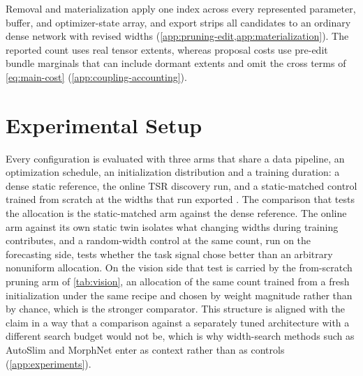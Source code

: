 \documentclass[10pt]{article}
\theoremstyle{paper}
\begin{document}
Removal and materialization apply one index across every represented parameter, buffer, and optimizer-state array, and export strips all candidates to an ordinary dense network with revised widths (\cref{app:pruning-edit,app:materialization}). The reported count uses real tensor extents, whereas proposal costs use pre-edit bundle marginals that can include dormant extents and omit the cross terms of \cref{eq:main-cost} (\cref{app:coupling-accounting}).

\section{Experimental Setup}
\label{sec:experiments}
Every configuration is evaluated with three arms that share a data pipeline, an optimization schedule, an initialization distribution and a training duration: a dense static reference, the online TSR discovery run, and a static-matched control trained from scratch at the widths that run exported \citep{liu2018rethinking,frankle2018lottery}. The comparison that tests the allocation is the static-matched arm against the dense reference. The online arm against its own static twin isolates what changing widths during training contributes, and a random-width control at the same count, run on the forecasting side, tests whether the task signal chose better than an arbitrary nonuniform allocation. On the vision side that test is carried by the from-scratch pruning arm of \cref{tab:vision}, an allocation of the same count trained from a fresh initialization under the same recipe and chosen by weight magnitude rather than by chance, which is the stronger comparator. This structure is aligned with the claim in a way that a comparison against a separately tuned architecture with a different search budget would not be, which is why width-search methods such as AutoSlim and MorphNet enter as context rather than as controls (\cref{app:experiments}).
\end{document}
